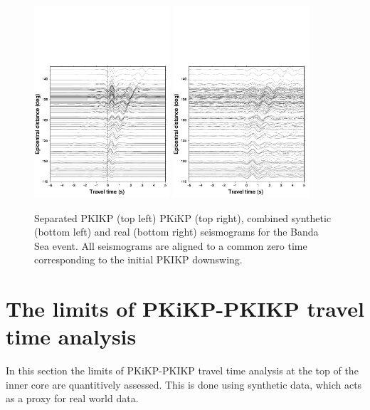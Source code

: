 \documentclass[11pt,a4paper]{article}
\begin{document}
\begin{figure}
	\includegraphics[width=0.45\textwidth]{figures/bandasea/bandasea_both_aligned}
	\includegraphics[width=0.45\textwidth]{figures/bandasea/bandasea_real_aligned}
	\caption{Separated PKIKP (top left) PKiKP (top right), combined synthetic (bottom left) and real (bottom right) seismograms for the Banda Sea event. All seismograms are aligned to a common zero time corresponding to the initial PKIKP downswing.}
	\label{fig:Synth aligned}
\end{figure}

\section{The limits of PKiKP-PKIKP travel time analysis}
\label{sec:Limits}

In this section the limits of PKiKP-PKIKP travel time analysis at the top of the inner core are quantitively assessed. This is done using synthetic data, which acts as a proxy for real world data.
\end{document}
